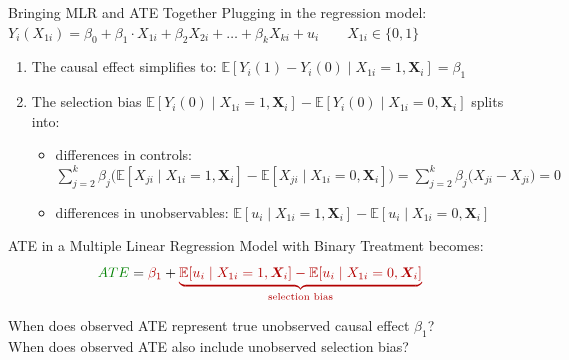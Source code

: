 \documentclass[9pt,aspectratio=169]{beamer}
\newcommand{\E}{\mathbb{E}}
\begin{document}
\begin{frame}{Bringing MLR and ATE Together}
  Plugging in the regression model:
  $Y_i(X_{1i}) = \beta_0 + \beta_1 \cdot X_{1i} + \beta_2 X_{2i} + \dots + \beta_k X_{ki} + u_i \qquad X_{1i} \in \{0,1\} $
  \vspace{-0.1cm}

  
  \begin{enumerate}
    \item The causal effect simplifies to:
      $\E[Y_i(1)-Y_i(0)\mid X_{1i}=1, \boldsymbol{X}_i] = \beta_1$
    \item The selection bias $\E[Y_i(0)\mid X_{1i}=1, \boldsymbol{X}_i]-\E[Y_i(0)\mid X_{1i}=0, \boldsymbol{X}_i]$ splits into:
    \begin{itemize}
      \item differences in controls: $\sum_{j=2}^{k} \beta_j \big(\E[X_{ji}\mid X_{1i}=1, \boldsymbol{X}_i]-\E[X_{ji}\mid X_{1i}=0, \boldsymbol{X}_i]\big) 
      =
      \sum_{j=2}^{k} \beta_j \big(X_{ji} - X_{ji}\big)
      = 0$
      \item differences in unobservables: $\E[u_i\mid X_{1i}=1, \boldsymbol{X}_i]-\E[u_i\mid X_{1i}=0, \boldsymbol{X}_i]$
    \end{itemize}
  \end{enumerate}
  \pause
  ATE in a Multiple Linear Regression Model with Binary Treatment becomes:
    \[
    \textcolor{green!50!black}{ATE} = \textcolor{red!70!black}{\beta_1} + \textcolor{red!70!black}{\underbrace{\E[u_i\mid X_{1i}=1, \boldsymbol{X}_i]-\E[u_i\mid X_{1i}=0, \boldsymbol{X}_i]}_{\text{selection bias}}}
    \]
  \vspace{-0.5cm}
  \begin{center}
    When does \textcolor{green!50!black}{observed ATE} represent true \textcolor{red!70!black}{unobserved causal effect $\beta_1$}? 
    \\ 
    When does \textcolor{green!50!black}{observed ATE} also include \textcolor{red!70!black}{unobserved selection bias}?
  \end{center}
\end{frame}
\end{document}
